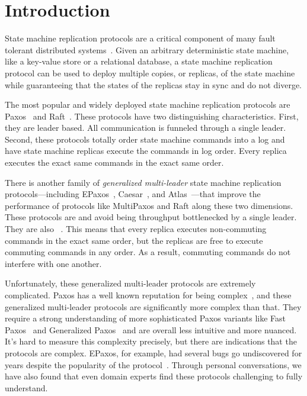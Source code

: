 \section{Introduction}
State machine replication protocols are a critical component of many fault
tolerant distributed systems~\cite{burrows2006chubby, corbett2013spanner,
thomson2012calvin, baker2011megastore, taft2020cockroachdb}. Given an arbitrary
deterministic state machine, like a key-value store or a relational database, a
state machine replication protocol can be used to deploy multiple copies, or
replicas, of the state machine while guaranteeing that the states of the
replicas stay in sync and do not diverge.

The most popular and widely deployed state machine replication protocols are
Paxos~\cite{lamport1998part, burrows2006chubby, corbett2013spanner} and
Raft~\cite{ongaro2014search, taft2020cockroachdb, tidb2019website,
yugabyte2019website}. These protocols have two distinguishing characteristics.
First, they are leader based. All communication is funneled through a single
leader. Second, these protocols totally order state machine commands into a log
and have state machine replicas execute the commands in log order. Every
replica executes the exact same commands in the exact same order.

There is another family of \emph{generalized multi-leader} state machine
replication protocols---including EPaxos~\cite{moraru2013there},
Caesar~\cite{arun2017speeding}, and Atlas~\cite{enes2020state}---that improve
the performance of protocols like MultiPaxos and Raft along these two
dimensions. These protocols are  and avoid being
throughput bottlenecked by a single leader. They are also
~\cite{lamport2005generalized, losa2016brief}. This means
that every replica executes non-commuting commands in the exact same order, but
the replicas are free to execute commuting commands in any order. As a result,
commuting commands do not interfere with one another.

Unfortunately, these generalized multi-leader protocols are extremely
complicated. Paxos has a well known reputation for being
complex~\cite{lamport2001paxos, van2015paxos, ongaro2014search}, and these
generalized multi-leader protocols are significantly more complex than that.
They require a strong understanding of more sophisticated Paxos variants like
Fast Paxos~\cite{lamport2006fast} and Generalized
Paxos~\cite{lamport2005generalized} and are overall less intuitive and more
nuanced. It's hard to measure this complexity precisely, but there are
indications that the protocols are complex. EPaxos, for example, had several
bugs go undiscovered for years despite the popularity of the
protocol~\cite{sutra2011fast}. Through personal conversations, we have also
found that even domain experts find these protocols challenging to fully
understand.

